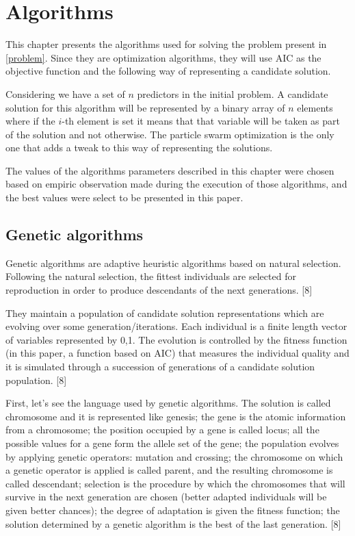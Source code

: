 \chapter{Algorithms}
\label{chapt4}

This chapter presents the algorithms used for solving the problem present in \ref{problem}. Since they are optimization algorithms, they will use AIC as the objective function and the following way of representing a candidate solution.

Considering we have a set of $n$ predictors in the initial problem. A candidate solution for this algorithm will be represented by a binary array of $n$ elements where if the $i$-th element is set it means that that variable will be taken as part of the solution and not otherwise. The particle swarm optimization is the only one that adds a tweak to this way of representing the solutions.

The values of the algorithms parameters described in this chapter were chosen based on empiric observation made during the execution of those algorithms, and the best values were select to be presented in this paper.

\section{Genetic algorithms}
Genetic algorithms are adaptive heuristic algorithms based on natural selection. Following the natural selection, the fittest individuals are selected for reproduction in order to produce descendants of the next generations. [8]

They maintain a population of candidate solution representations which are evolving over some generation/iterations. Each individual is a finite length vector of variables represented by {0,1}. The evolution is controlled by the fitness function (in this paper, a function based on AIC) that measures the individual quality and it is simulated through a succession of generations of a candidate solution population. [8]

First, let's see the language used by genetic algorithms. The solution is called chromosome and it is represented like genesis; the gene is the atomic information from a chromosome; the position occupied by a gene is called locus; all the possible values for a gene form the allele set of the gene; the population evolves by applying genetic operators: mutation and crossing; the chromosome on which a genetic operator is applied is called parent, and the resulting chromosome is called descendant; selection is the procedure by which the chromosomes that will survive in the next generation are chosen (better adapted individuals will be given better chances); the degree of adaptation is given the fitness function; the solution determined by a genetic algorithm is the best of the last generation. [8]


